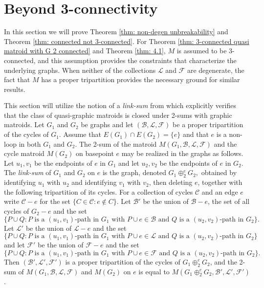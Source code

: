 \documentclass[12pt]{article}
\theoremstyle{definition}
\theoremstyle{plain} %
\newcommand{\cB}{\mathcal{B}}
\newcommand{\cC}{\mathcal{C}}
\newcommand{\cF}{\mathcal{F}}
\newcommand{\cL}{\mathcal{L}}
\begin{document}
\section{Beyond 3-connectivity} \label{sec: future work}


In this section we will prove Theorem \ref{thm: non-degen unbreakability} and Theorem \ref{thm: connected not 3-connected}. For Theorem \ref{thm: 3-connected quasi matroid with G 2 connected} and Theorem \ref{thm: 4.1}, $M$ is assumed to be 3-connected, and this assumption provides the constraints that characterize the underlying graphs. When neither of the collections $\cL$ and $\cF$ are degenerate, the fact that $M$ has a proper tripartition provides the necessary ground for similar results. 


This section will utilize the notion of a \emph{link-sum} from \cite{Bowler-Funk-Slilaty20} which explicitly verifies that the class of quasi-graphic matroids is closed under 2-sums with graphic matroids. Let $G_1$ and $G_2$ be graphs and let $(\cB,\cL,\cF)$ be a proper tripartition of the cycles of $G_1$. Assume that $E(G_1)\cap E(G_2)=\{e\}$ and that $e$ is a non-loop in both $G_1$ and $G_2$. The 2-sum of the matroid $M(G_1,\cB,\cL,\cF)$ and the cycle matroid $M(G_2)$ on basepoint $e$ may be realized in the graphs as follows. Let $u_1,v_1$ be the endpoints of $e$ in $G_1$ and let $u_2,v_2$ be the endpoints of $e$ in $G_2$. The \emph{link-sum} of $G_1$ and $G_2$ on $e$ is the graph, denoted $G_1\oplus_2^e G_2,$ obtained by identifying $u_1$ with $u_2$ and identifying $v_1$ with $v_2$, then deleting $e$, together with the following tripartition of its cycles. For a collection of cycles $\cC$ and an edge $e$ write $\cC-e$ for the set $\{C\in\cC: e \notin C\}$. Let $\cB'$ be the union of $\cB-e$, the set of all cycles of $G_2-e$ and the set 
$$
\{P\cup Q: P \text{ is a } (u_1,v_1) \text{-path in $G_1$ with } P\cup e\in\cB \text{ and $Q$ is a } (u_2,v_2)\text{-path in $G_2$}\}. 
$$
Let $\cL'$ be the union of $\cL-e$ and the set
$$
\{P\cup Q: P \text{ is a } (u_1,v_1) \text{-path in $G_1$ with } P\cup e\in\cL \text{ and $Q$ is a } (u_2,v_2)\text{-path in $G_2$}\} 
$$
and let $\cF'$ be the union of $\cF-e$ and the set 
$$
\{P\cup Q: P \text{ is a } (u_1,v_1) \text{-path in $G_1$ with } P\cup e\in\cF \text{ and $Q$ is a } (u_2,v_2)\text{-path in $G_2$}\}. 
$$
Then $(\cB',\cL',\cF')$ is a proper tripartition of the cycles of $G_1\oplus_2^e G_2$, and the 2-sum of $M(G_1,\cB,\cL,\cF)$ and $M(G_2)$ on $e$ is equal to $M(G_1\oplus_2^e G_2, \cB',\cL',\cF')$ \cite[Section 4]{Bowler-Funk-Slilaty20}. 
\end{document}
